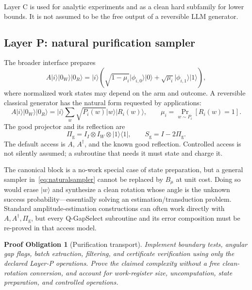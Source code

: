 \documentclass[10pt]{article}
\newtheorem{obligation}{Proof Obligation}
\theoremstyle{definition}
\newcommand{\ket}[1]{\lvert #1\rangle}
\newcommand{\bra}[1]{\langle #1\rvert}
\begin{document}
Layer C is used for analytic experiments and as a clean hard subfamily for lower
bounds.  It is not assumed to be the free output of a reversible LLM generator.

\subsection{Layer P: natural purification sampler}

The broader interface prepares
\begin{equation}
 A\ket{i}\ket{0_W}\ket{0_R}
 =\ket{i}\left(
 \sqrt{1-\mu_i}\ket{\phi_{i,0}}\ket{0}
 +\sqrt{\mu_i}\ket{\phi_{i,1}}\ket{1}
 \right),
 \label{eq:purification}
\end{equation}
where normalized work states may depend on the arm and outcome.  A reversible
classical generator has the natural form requested by applications:
\begin{equation}
 A\ket{i}\ket{0_W}\ket{0_R}
 =\ket{i}\sum_w\sqrt{P_i(w)}\ket{w}\ket{R_i(w)},
 \qquad
 \mu_i=\Pr_{w\sim P_i}[R_i(w)=1].
 \label{eq:naturalsampler}
\end{equation}
The good projector and its reflection are
\begin{equation}
 \Pi_{\mathrm g}=I_I\otimes I_W\otimes\ket{1}\bra{1},
 \qquad S_{\mathrm g}=I-2\Pi_{\mathrm g}.
\end{equation}
The default access is $A$, $A^\dagger$, and the known good reflection.  Controlled
access is not silently assumed; a subroutine that needs it must state and charge
it.

The canonical block is a no-work special case of state preparation, but a general
sampler in~\eqref{eq:naturalsampler} cannot be replaced by $B_\mu$ at unit cost.
Doing so would erase $\ket{w}$ and synthesize a clean rotation whose angle is the
unknown success probability---essentially solving an estimation/transduction
problem.  Standard amplitude-estimation constructions can often work directly
with $A,A^\dagger,\Pi_{\mathrm g}$, but every Q-GapSelect subroutine and its error
composition must be re-proved in that access model.

\begin{obligation}[Purification transport]
Implement boundary tests, angular gap flags, batch extraction, filtering, and
certificate verification using only the declared Layer-P operations.  Prove the
claimed complexity without a free clean-rotation conversion, and account for
work-register size, uncomputation, state preparation, and controlled operations.
\end{obligation}
\end{document}

